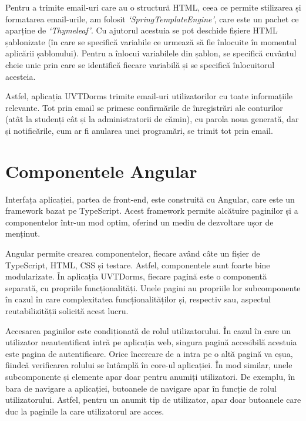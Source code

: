 \documentclass[12pt,a4paper]{report}
\theoremstyle{definition}
\theoremstyle{remark}
\begin{document}
\par Pentru a trimite email-uri care au o structură HTML, ceea ce permite stilizarea și formatarea email-urile, am folosit \textit{`SpringTemplateEngine'}, care este un pachet ce aparține de \textit{`Thymeleaf'}. Cu ajutorul acestuia se pot deschide fișiere HTML șablonizate (în care se specifică variabile ce urmează să fie înlocuite în momentul aplicării șablonului). Pentru a înlocui variabilele din șablon, se specifică cuvântul cheie unic prin care se identifică fiecare variabilă și se specifică înlocuitorul acesteia\cite{template_engine_for_spring_boot}.

\par Astfel, aplicația UVTDorms trimite email-uri utilizatorilor cu toate informațiile relevante. Tot prin email se primesc confirmările de înregistrări ale conturilor (atât la studenți cât și la administratorii de cămin), cu parola noua generată, dar și notificările, cum ar fi anularea unei programări, se trimit tot prin email.

\section{Componentele Angular}

\par Interfața aplicației, partea de front-end, este construită cu Angular, care este un framework bazat pe TypeScript\cite{geetha2022interpretation}. Acest framework permite alcătuire paginilor și a componentelor într-un mod optim, oferind un mediu de dezvoltare ușor de menținut.

\par Angular permite crearea componentelor, fiecare având câte un fișier de TypeScript, HTML, CSS și testare. Astfel, componentele sunt foarte bine modularizate. În aplicația UVTDorms, fiecare pagină este o componentă separată, cu propriile \textnormal{func\-ți\-o\-na\-li\-tă\-ți}. Unele pagini au propriile lor subcomponente în cazul în care complexitatea \textnormal{func\-ți\-o\-na\-li\-tă\-ți\-lor} și, respectiv sau, aspectul reutabilizității solicită acest lucru.

\par Accesarea paginilor este condiționată de rolul utilizatorului. În cazul în care un utilizator neautentificat intră pe aplicația web, singura pagină accesibilă acestuia este pagina de autentificare. Orice încercare de a intra pe o altă pagină va eșua, fiindcă verificarea rolului se întâmplă în core-ul aplicației. În mod similar, unele subcomponente și elemente apar doar pentru anumiți utilizatori. De exemplu, în bara de navigare a aplicației, butoanele de navigare apar în funcție de rolul utilizatorului. Astfel, pentru un anumit tip de utilizator, apar doar butoanele care duc la paginile la care utilizatorul are acces.
\end{document}
